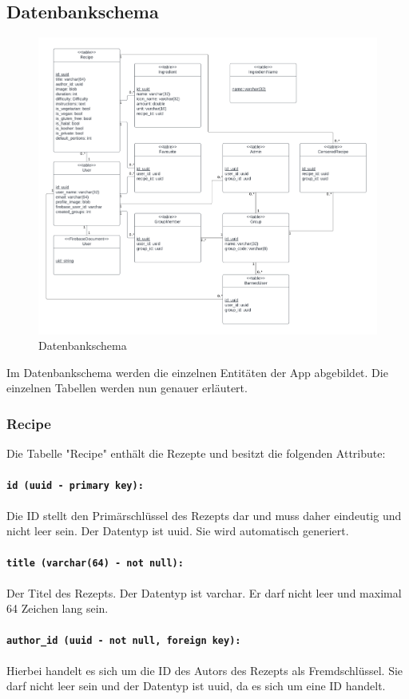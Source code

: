 \documentclass{entwurfsheft}
\begin{document}
\begin{sloppypar}
\subsection{Datenbankschema}
\begin{figure}[htp]
    \centering
    \includegraphics[width = \linewidth]{images/database/databaseSchema.pdf}
    \caption{Datenbankschema}
\end{figure}
Im Datenbankschema werden die einzelnen Entitäten der App abgebildet. Die einzelnen Tabellen werden nun genauer erläutert.
\newpage
\subsubsection{Recipe}
Die Tabelle "Recipe" enthält die Rezepte und besitzt die folgenden Attribute:
\paragraph{\texttt{id (uuid - primary key):}} Die ID stellt den Primärschlüssel des Rezepts dar und muss daher eindeutig und nicht leer sein. Der Datentyp ist \Gls{uuid}. Sie wird automatisch generiert.
\paragraph{\texttt{title (varchar(64) - not null):}} Der Titel des Rezepts. Der Datentyp ist \Gls{varchar}. Er darf nicht leer und maximal 64 Zeichen lang sein.
\paragraph{\texttt{author\_id (uuid - not null, foreign key):}} Hierbei handelt es sich um die ID des Autors des Rezepts als Fremdschlüssel. Sie darf nicht leer sein und der Datentyp ist \Gls{uuid}, da es sich um eine ID handelt.

\end{sloppypar}
\end{document}
